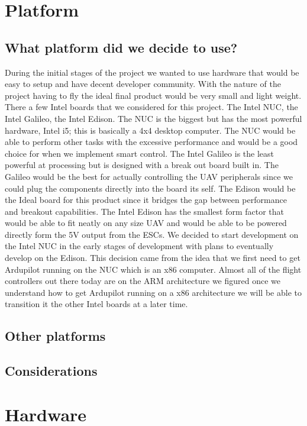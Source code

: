\documentclass[letterpaper,10pt,notitlepage,fleqn]{article}
\begin{document}
\section{Platform}

\subsection{What platform did we decide to use?}
\indent During the initial stages of the project we wanted to use hardware that would be easy to setup and have decent developer community. With the nature of the project having to fly the ideal final product would be very small and light weight. There a few Intel boards that we considered for this project. The Intel NUC, the Intel Galileo, the Intel Edison. The NUC is the biggest but has the most powerful hardware, Intel i5; this is basically a 4x4 desktop computer. The NUC would be able to perform other tasks with the excessive performance and would be a good choice for when we implement smart control. The Intel Galileo is the least powerful at processing but is designed with a break out board built in. The Galileo would be the best for actually controlling the UAV peripherals since we could plug the components directly into the board its self. The Edison would be the Ideal board for this product since it bridges the gap between performance and breakout capabilities. The Intel Edison has the smallest form factor that would be able to fit neatly on any size UAV and would be able to be powered directly form the 5V output from the ESCs. 
We decided to start development on the Intel NUC in the early stages of development with plans to eventually develop on the Edison. This decision came from the idea that we first need to get Ardupilot running on the NUC which is an x86 computer. Almost all of the flight controllers out there today are on the ARM architecture we figured once we understand how to get Ardupilot running on a x86 architecture we will be able to transition it the other Intel boards at a later time.

\subsection{Other platforms}
\indent 
\subsection{Considerations}
\indent
\section{Hardware}
\end{document}
